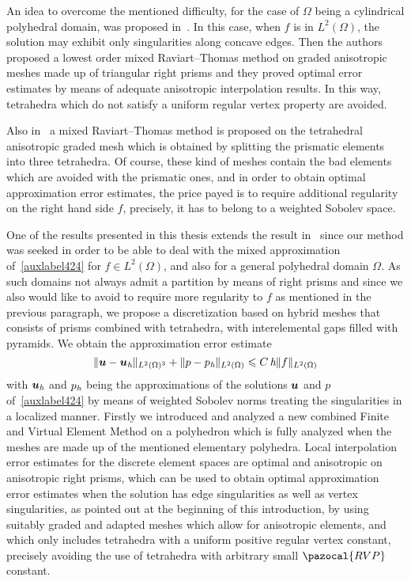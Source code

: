 \tetsTikz

An idea to overcome the mentioned difficulty, for the case of $\Omega$ being a 
cylindrical polyhedral domain, 
was proposed in~\cite{MR1866274}. In  this case, when $f$ is in $L^2(\Omega)$, 
the solution may exhibit only singularities along concave edges.
Then the authors proposed a lowest order mixed Raviart--Thomas method on graded 
anisotropic meshes made up of triangular right prisms and they proved optimal error 
estimates by means of adequate anisotropic interpolation results. 
In this way, tetrahedra which do not satisfy a
uniform regular vertex property are avoided.

Also in~\cite{MR1866274} a mixed Raviart--Thomas method is 
proposed on the tetrahedral 
anisotropic graded mesh which is obtained by splitting the prismatic elements 
into three tetrahedra. Of course, these kind of meshes contain the bad elements 
which are avoided with the prismatic ones, and in order to obtain optimal 
approximation error estimates, the price payed is to require additional regularity 
on the right hand side $f$, precisely, it has to belong to a weighted Sobolev space.

One of the results presented in this thesis extends
the result in~\cite{MR1866274} since our method was seeked in order to be able 
to deal with the mixed approximation of~\eqref{auxlabel424} for $f\in L^2(\Omega)$,
and also for a general polyhedral domain $\Omega$. As such domains not always 
admit a partition by means of right prisms and since 
we also would like to avoid to require more regularity to $f$ as mentioned in 
the previous paragraph, we propose a 
discretization based on hybrid meshes that consists of prisms combined with 
tetrahedra, with 
interelemental gaps filled with pyramids. We obtain 
the approximation error estimate
\begin{equation}\label{auxlabel401}
 \|\boldsymbol{u}-\boldsymbol{u}_{\textit h}\|_{L^2(\Omega)^3} + \|p-p_{\textit h}\|_{L^2(\Omega)} 
 \leqslant C\,\textit{h}\|f\|_{L^2(\Omega)}
\end{equation}
with $\boldsymbol{u}_{\textit h}$ and $p_{\textit h}$ being the approximations of the 
solutions $\boldsymbol{u}$ and $p$ of~\eqref{auxlabel424} by means of weighted Sobolev norms
treating the singularities in a localized manner. 
Firstly we introduced and analyzed a new 
combined Finite and Virtual 
Element Method on a polyhedron which is fully analyzed when the meshes are made 
up of the mentioned elementary polyhedra. Local 
interpolation error estimates for the discrete element spaces are 
optimal and anisotropic on anisotropic right prisms, which can be
used to obtain optimal approximation error estimates when the 
solution has edge singularities as well as vertex singularities, as pointed out at the beginning of 
this introduction, by using suitably graded and adapted meshes which 
allow for anisotropic elements, and which only includes tetrahedra with a
uniform positive regular vertex constant, precisely avoiding the use of tetrahedra
with arbitrary small $\pazocal{RVP}$ constant.

